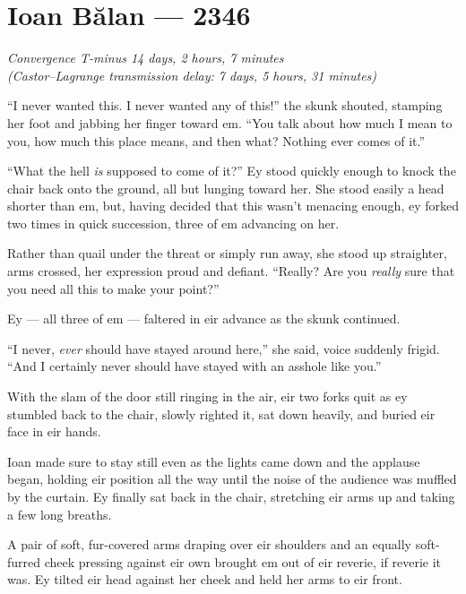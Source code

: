 \hypertarget{ioan-bux103lan-2346}{%
\chapter{Ioan Bălan — 2346}\label{ioan-bux103lan-2346}}

\begin{center}
\emph{Convergence T-minus 14 days, 2 hours, 7 minutes}\\
\emph{(Castor--Lagrange transmission delay: 7 days, 5 hours, 31 minutes)}
\end{center}

\noindent ``I never wanted this. I never wanted any of this!'' the skunk shouted, stamping her foot and jabbing her finger toward em. ``You talk about how much I mean to you, how much this place means, and then what? Nothing ever comes of it.''

``What the hell \emph{is} supposed to come of it?'' Ey stood quickly enough to knock the chair back onto the ground, all but lunging toward her. She stood easily a head shorter than em, but, having decided that this wasn't menacing enough, ey forked two times in quick succession, three of em advancing on her.

Rather than quail under the threat or simply run away, she stood up straighter, arms crossed, her expression proud and defiant. ``Really? Are you \emph{really} sure that you need all this to make your point?''

Ey — all three of em — faltered in eir advance as the skunk continued.

``I never, \emph{ever} should have stayed around here,'' she said, voice suddenly frigid. ``And I certainly never should have stayed with an asshole like you.''

With the slam of the door still ringing in the air, eir two forks quit as ey stumbled back to the chair, slowly righted it, sat down heavily, and buried eir face in eir hands.

Ioan made sure to stay still even as the lights came down and the applause began, holding eir position all the way until the noise of the audience was muffled by the curtain. Ey finally sat back in the chair, stretching eir arms up and taking a few long breaths.

A pair of soft, fur-covered arms draping over eir shoulders and an equally soft-furred cheek pressing against eir own brought em out of eir reverie, if reverie it was. Ey tilted eir head against her cheek and held her arms to eir front.

